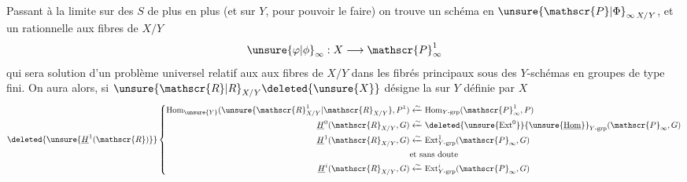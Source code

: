 Passant à la limite sur des $S$ de plus en plus {} (et {} sur $Y$, pour pouvoir le faire) on trouve un schéma en {} ${\unsure{\mathscr{P}|\Phi}}_{\infty\,X/Y}$,  et un  rationnelle {} aux fibres de $X/Y$
\[
{\unsure{\varphi|\phi}}_\infty:X\longrightarrow\mathscr{P}_\infty^1
\]
qui sera solution d'un problème universel relatif aux {} {} aux fibres de $X/Y$ dans les fibrés principaux sous des $Y$-schémas en groupes  de type fini. On aura alors, si ${\unsure{\mathscr{R}|R}}_{X/Y}\deleted{{\unsure{X}}}$ désigne la \uline{{}} sur $Y$ définie par $X$
\[
\deleted{{\unsure{\underline{H}^1(\mathscr{R})}}}
\left\{\begin{aligned}
\operatorname{Hom}_{{\unsure{Y}}}({\unsure{\mathscr{R}_{X/Y}^1|\mathscr{R}_{X/Y}}},P^1)&\xleftarrow{\sim}\operatorname{Hom}_{Y\text{-}\mathrm{grp}}(\mathscr{P}_\infty^1,P)\\
\underline{H}^0(\mathscr{R}_{X/Y},G)&\xleftarrow{\sim}\deleted{{\unsure{\operatorname{Ext}^0}}}{\unsure{\underline{\operatorname{Hom}}}}_{Y\text{-}\mathrm{grp}}(\mathscr{P}_\infty,G)\\
\underline{H}^1(\mathscr{R}_{X/Y},G)&\xleftarrow{\sim}\operatorname{Ext}^1_{Y\text{-}\mathrm{grp}}(\mathscr{P}_\infty,G)\\
&\text{et sans doute}\\
\underline{H}^i(\mathscr{R}_{X/Y},G)&\xleftarrow{\sim}\operatorname{Ext}^i_{Y\text{-}\mathrm{grp}}(\mathscr{P}_\infty,G)
\end{aligned}\right.
\]

